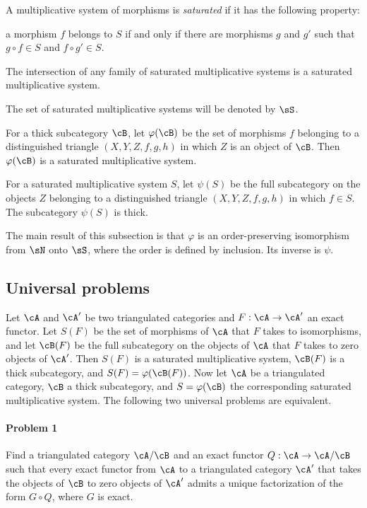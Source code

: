 \documentclass[12pt,oneside,english]{smfbook}
\begin{document}
A multiplicative system of morphisms is \emph{saturated} if it has the following property:

a morphism $f$ belongs to $S$ if and only if there are morphisms $g$ and $g'$ such that $g\circ f\in S$ and $f\circ g'\in S$.

The intersection of any family of saturated multiplicative systems is a saturated multiplicative system.

The set of saturated multiplicative systems will be denoted by $\sS$.

For a thick subcategory $\cB$, let $\varphi(\cB)$ be the set of morphisms $f$ belonging to a distinguished triangle $(X,Y,Z,f,g,h)$ in which $Z$ is an object of $\cB$. Then $\varphi(\cB)$ is a saturated multiplicative system.

For a saturated multiplicative system $S$, let $\psi(S)$ be the full subcategory on the objects $Z$ belonging to a distinguished triangle $(X,Y,Z,f,g,h)$ in which $f\in S$. The subcategory $\psi(S)$ is thick.

The main result of this subsection is that $\varphi$ is an order-preserving isomorphism from $\sN$ onto $\sS$, where the order is defined by inclusion. Its inverse is $\psi$.

\subsection{Universal problems}\label{VIII:2-2}

Let $\cA$ and $\cA'$ be two triangulated categories and $F:\cA\to\cA'$ an exact functor. Let $S(F)$ be the set of morphisms of $\cA$ that $F$ takes to isomorphisms, and let $\cB(F)$ be the full subcategory on the objects of $\cA$ that $F$ takes to zero objects of $\cA'$. Then $S(F)$ is a saturated multiplicative system, $\cB(F)$ is a thick subcategory, and $S(F)=\varphi(\cB(F))$. Now let $\cA$ be a triangulated category, $\cB$ a thick subcategory, and $S=\varphi(\cB)$ the corresponding saturated multiplicative system. The following two universal problems are equivalent.

\paragraph{Problem 1}
\hypertarget{VIII:prob1}{} Find a triangulated category $\cA/\cB$ and an exact functor $Q:\cA\to\cA/\cB$ such that every exact functor from $\cA$ to a triangulated category $\cA'$ that takes the objects of $\cB$ to zero objects of $\cA'$ admits a unique factorization of the form $G\circ Q$, where $G$ is exact.
\end{document}
